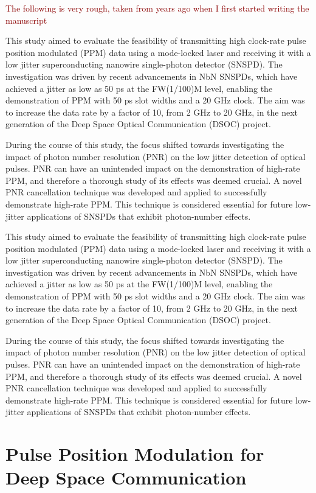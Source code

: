\documentclass[11pt]{caltech_thesis} %
\begin{document}
\textcolor{darkred}{ The following is very rough, taken from years ago
when I first started writing the manuscript }

This study aimed to evaluate the feasibility of transmitting high
clock-rate pulse position modulated (PPM) data using a mode-locked laser
and receiving it with a low jitter superconducting nanowire
single-photon detector (SNSPD). The investigation was driven by recent
advancements in NbN SNSPDs, which have achieved a jitter as low as 50 ps
at the FW(1/100)M level, enabling the demonstration of PPM with 50 ps
slot widths and a 20 GHz clock. The aim was to increase the data rate by
a factor of 10, from 2 GHz to 20 GHz, in the next generation of the Deep
Space Optical Communication (DSOC) project.

During the course of this study, the focus shifted towards investigating
the impact of photon number resolution (PNR) on the low jitter detection
of optical pulses. PNR can have an unintended impact on the
demonstration of high-rate PPM, and therefore a thorough study of its
effects was deemed crucial. A novel PNR cancellation technique was
developed and applied to successfully demonstrate high-rate PPM. This
technique is considered essential for future low-jitter applications of
SNSPDs that exhibit photon-number effects.

This study aimed to evaluate the feasibility of transmitting high
clock-rate pulse position modulated (PPM) data using a mode-locked laser
and receiving it with a low jitter superconducting nanowire
single-photon detector (SNSPD). The investigation was driven by recent
advancements in NbN SNSPDs, which have achieved a jitter as low as 50 ps
at the FW(1/100)M level, enabling the demonstration of PPM with 50 ps
slot widths and a 20 GHz clock. The aim was to increase the data rate by
a factor of 10, from 2 GHz to 20 GHz, in the next generation of the Deep
Space Optical Communication (DSOC) project.

During the course of this study, the focus shifted towards investigating
the impact of photon number resolution (PNR) on the low jitter detection
of optical pulses. PNR can have an unintended impact on the
demonstration of high-rate PPM, and therefore a thorough study of its
effects was deemed crucial. A novel PNR cancellation technique was
developed and applied to successfully demonstrate high-rate PPM. This
technique is considered essential for future low-jitter applications of
SNSPDs that exhibit photon-number effects.

\hypertarget{pulse-position-modulation-for-deep-space-communication}{%
\section{Pulse Position Modulation for Deep Space
Communication}\label{pulse-position-modulation-for-deep-space-communication}}
\end{document}

